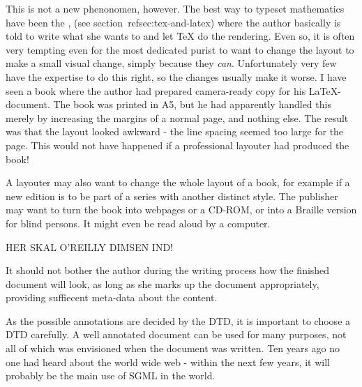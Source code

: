 This is not a new phenonomen, however.  The best way to typeset
mathematics have been the , (see section~\textsf{ref{sec:tex-and-latex}}) where the
author basically is told to write what she wants to and let {TeX} do
the rendering.  Even so, it is often very tempting even for the most
dedicated purist to want to change the layout to make a small visual
change, simply because they \textit{can}.  Unfortunately very few have
the expertise to do this right, so the changes usually make it worse.
I have seen a book where the author had prepared camera-ready copy for
his {\LaTeX}-document.  The book was printed in A5, but he had
apparently handled this merely by increasing the margins of a normal
page, and nothing else.  The result was that the layout looked awkward
- the line spacing seemed too large for the page.  This would not have
happened if a professional layouter had produced the book!

A layouter may also want to change the whole layout of a book, for
example if a new edition is to be part of a series with another
distinct style.  The publisher may want to turn the book into webpages
or a CD-ROM, or into a Braille version for blind persons.  It might
even be read aloud by a computer.

\textsf{HER SKAL O'REILLY DIMSEN IND!}

It should not bother the author during the writing process how the
finished document will look, as long as she marks up the document
appropriately, providing suffiecent meta-data about the content.

As the possible annotations are decided by the DTD, it is important to
choose a DTD carefully.  A well annotated document can be used for
many purposes, not all of which was envisioned when the document was
written.  Ten years ago no one had heard about the world wide web -
within the next few years, it will probably be the main use of SGML in
the world.








